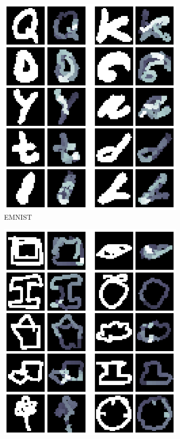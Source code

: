 \begin{figure}[!ht]
\begin{subfigure}[b]{0.3\textwidth}
        \includegraphics[width=\textwidth]{images/resultate/base-speed-emnist.png}
        \caption{EMNIST}
    \end{subfigure}
    \begin{subfigure}[b]{0.3\textwidth}
        \centering
        \includegraphics[width=\textwidth]{images/resultate/base-speed-quickdraw.png}

\end{subfigure}
\end{figure}
